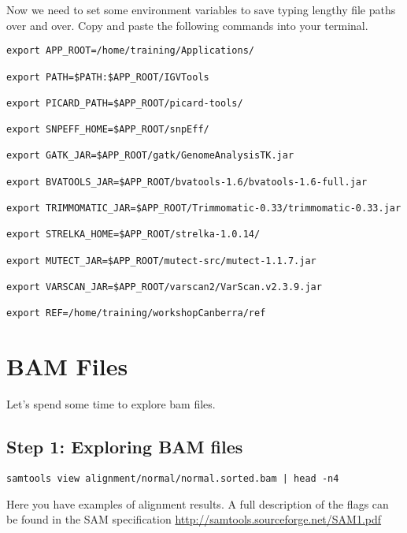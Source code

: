 \begin{steps}
Now we need to set some environment variables to save typing lengthy file paths over and over. Copy and paste the following commands into your terminal.
\begin{lstlisting}
export APP_ROOT=/home/training/Applications/

export PATH=$PATH:$APP_ROOT/IGVTools

export PICARD_PATH=$APP_ROOT/picard-tools/

export SNPEFF_HOME=$APP_ROOT/snpEff/

export GATK_JAR=$APP_ROOT/gatk/GenomeAnalysisTK.jar

export BVATOOLS_JAR=$APP_ROOT/bvatools-1.6/bvatools-1.6-full.jar

export TRIMMOMATIC_JAR=$APP_ROOT/Trimmomatic-0.33/trimmomatic-0.33.jar

export STRELKA_HOME=$APP_ROOT/strelka-1.0.14/

export MUTECT_JAR=$APP_ROOT/mutect-src/mutect-1.1.7.jar

export VARSCAN_JAR=$APP_ROOT/varscan2/VarScan.v2.3.9.jar

export REF=/home/training/workshopCanberra/ref
\end{lstlisting}
\end{steps}




\section{BAM Files}

Let's spend some time to explore bam files.

\subsection{Step 1: Exploring BAM files}

\begin{steps}
\begin{lstlisting}
samtools view alignment/normal/normal.sorted.bam | head -n4
\end{lstlisting}
\end{steps}

Here you have examples of alignment results.
A full description of the flags can be found in the SAM specification
\url{http://samtools.sourceforge.net/SAM1.pdf}

